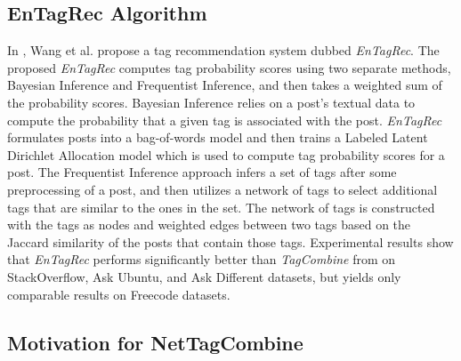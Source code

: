 \documentclass[10pt]{IEEEtran}
\begin{document}
\subsection{EnTagRec Algorithm}

In \cite{2}, Wang et al. propose a tag recommendation system dubbed \textit{EnTagRec}. The proposed \textit{EnTagRec} computes tag probability scores using two separate methods, Bayesian Inference and Frequentist Inference, and then takes a weighted sum of the probability scores. Bayesian Inference relies on a post’s textual data to compute the probability that a given tag is associated with the post. \textit{EnTagRec} formulates posts into a bag-of-words model and then trains a Labeled Latent Dirichlet Allocation model which is used to compute tag probability scores for a post. The Frequentist Inference approach infers a set of tags after some preprocessing of a post, and then utilizes a network of tags to select additional tags that are similar to the ones in the set. The network of tags is constructed with the tags as nodes and weighted edges between two tags based on the Jaccard similarity of the posts that contain those tags. Experimental results show that \textit{EnTagRec} performs significantly better than \textit{TagCombine} from \cite{1} on StackOverflow, Ask Ubuntu, and Ask Different datasets, but yields only comparable results on Freecode datasets.

\subsection{Motivation for NetTagCombine}
\end{document}
